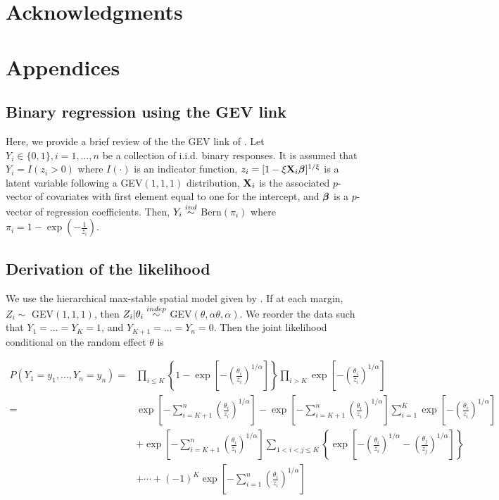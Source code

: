 \documentclass[11pt]{article}
\begin{document}
\section*{Acknowledgments}

\appendix
\section{Appendices}
\subsection{Binary regression using the GEV link} \label{rba:rarebinary}
Here, we provide a brief review of the the GEV link of \citet{Wang2010}.
Let $Y_i \in \{0, 1\}, i = 1, \ldots, n$ be a collection of i.i.d. binary responses.
It is assumed that $Y_i = I(z_i > 0)$ where $I(\cdot)$ is an indicator function, $z_i = [1 - \xi \mbox{\bf X}_i \mbox{\boldmath $\beta$}]^{1 / \xi}$ is a latent variable following a GEV$(1, 1, 1)$ distribution, $\mbox{\bf X}_i$ is the associated $p$-vector of covariates with first element equal to one for the intercept, and $\mbox{\boldmath $\beta$}$ is a $p$-vector of regression coefficients.
Then, $Y_i \stackrel{ind}{\sim}$ Bern$(\pi_i)$ where $\pi_i= 1 - \exp \left( -\frac{ 1 }{ z_i } \right)$.


\subsection{Derivation of the likelihood} \label{rba:likelihoodderivation}
We use the hierarchical max-stable spatial model given by \citet{Reich2012}. If at each margin, $Z_i \sim $ GEV$(1,1,1)$, then $Z_i | \theta_i \stackrel{indep}{\sim} $ GEV$(\theta, \alpha \theta, \alpha)$. We reorder the data such that $Y_1=\ldots=Y_K=1$, and $Y_{K+1} = \ldots = Y_n = 0$. Then the joint likelihood conditional on the random effect $\theta$ is

\begin{align} \label{rbeq:joint_cond}
	P(Y_1=y_1,\ldots,Y_n=y_n) =& \prod_{ i \le K } \left\{ 1 - \exp \left[ - \left( \frac{ \theta_i }{ z_i } \right)^{ 1/\alpha} \right] \right \} \prod_{ i > K } \exp \left[ -\left( \frac{ \theta_i }{ z_i } \right)^{1/\alpha} \right] \nonumber \\[0.5em]
		=& \exp \left[ -\sum_{ i = K+1}^{ n }\left( \frac{ \theta_i }{ z_i } \right)^{1/\alpha} \right] - \exp \left[ -\sum_{ i = K+1}^{ n }\left( \frac{ \theta_i }{ z_i } \right)^{1/\alpha} \right] \sum_{ i = 1}^{K} \exp\left[ -\left( \frac{ \theta_i }{ z_i } \right)^{ 1/\alpha} \right] \nonumber\\
		&  + \exp \left[ -\sum_{ i = K+1}^{ n }\left( \frac{ \theta_i }{ z_i } \right)^{1/\alpha} \right] \sum_{ 1 < i < j \le K } \left\{ \exp \left[ - \left( \frac{ \theta_i }{ z_i } \right)^{ 1/\alpha} - \left( \frac{ \theta_j }{ z_j } \right)^{ 1/\alpha } \right] \right \} \nonumber \\[0.5em]
		& + \cdots + (-1)^K \exp\left[ - \sum_{ i = 1 }^{ n }\left( \frac{ \theta_i }{ z_i } \right)^{ 1/\alpha} \right]
\end{align}
\end{document}
